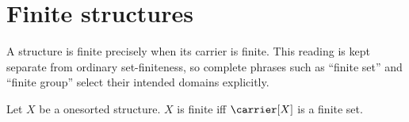 \section{Finite structures}



A structure is finite precisely when its carrier is finite.  This reading is
kept separate from ordinary set-finiteness, so complete phrases such as
``finite set'' and ``finite group'' select their intended domains explicitly.

\begin{definition}\label{finite_structure}
    Let $X$ be a onesorted structure.
    $X$ is finite iff $\carrier[X]$ is a finite set.
\end{definition}
